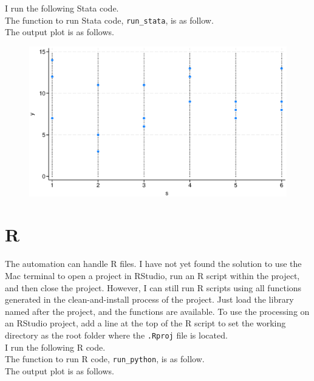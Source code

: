 \documentclass[12pt, a4paper]{article}
\begin{document}
I run the following Stata code.\\



The function to run Stata code, \texttt{run\_stata}, is as follow.\\



The output plot is as follows.\\

\begin{figure}[H]
	\includegraphics[width=.5\textwidth]{sample_stata_graph}
\end{figure}

\section{R}

The automation can handle R files. I have not yet found the solution to use the Mac terminal to open a project in RStudio, run an R script within the project, and then close the project. However, I can still run R scripts using all functions generated in the clean-and-install process of the project. Just load the library named after the project, and the functions are available. To use the processing on an RStudio project, add a line at the top of the R script to set the working directory as the root folder where the \texttt{.Rproj} file is located.\\

I run the following R code.\\



The function to run R code, \texttt{run\_python}, is as follow.\\



The output plot is as follows.\\
\end{document}
